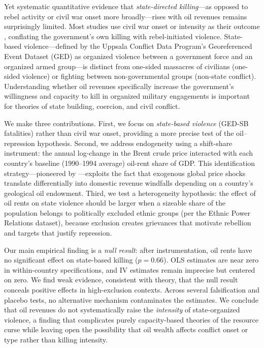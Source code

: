 \documentclass[12pt]{article}
\begin{document}
Yet systematic quantitative evidence that \emph{state-directed killing}---as
opposed to rebel activity or civil war onset more broadly---rises with oil
revenues remains surprisingly limited.
Most studies use civil war onset or intensity as their outcome
\citep{collier2004greed,humphreys2005natural,bruckner2010international},
conflating the government's own killing with rebel-initiated violence.
State-based violence---defined by the Uppsala Conflict Data
Program's Georeferenced Event Dataset (GED) as organized violence between
a government force and an organized armed group---is distinct from
one-sided massacres of civilians (one-sided violence) or fighting between
non-governmental groups (non-state conflict).
Understanding whether oil revenues specifically increase the government's
willingness and capacity to kill in organized military engagements is important
for theories of state building, coercion, and civil conflict.

We make three contributions.
First, we focus on \emph{state-based violence} (GED-SB fatalities) rather
than civil war onset, providing a more precise test of the oil--repression
hypothesis.
Second, we address endogeneity using a shift-share instrument:
the annual log-change in the Brent crude price interacted with
each country's baseline (1990--1994 average) oil-rent share of GDP.
This identification strategy---pioneered by
\citet{bruckner2010international}---exploits the fact that exogenous global
price shocks translate differentially into domestic revenue windfalls
depending on a country's geological oil endowment.
Third, we test a heterogeneity hypothesis: the effect of oil rents on
state violence should be larger when a sizeable share of the population
belongs to politically excluded ethnic groups (per the Ethnic Power Relations
dataset), because exclusion creates grievances that motivate rebellion and
targets that justify repression.

Our main empirical finding is a \emph{null result}:
after instrumentation, oil rents have no significant effect on
state-based killing ($p = 0.66$).
OLS estimates are near zero in within-country specifications,
and IV estimates remain imprecise but centered on zero.
We find weak evidence, consistent with theory, that
the null result conceals positive effects in high-exclusion contexts.
Across several falsification and placebo tests,
no alternative mechanism contaminates the estimates.
We conclude that oil revenues do not systematically raise the
\emph{intensity} of state-organized violence,
a finding that complicates purely capacity-based theories of the
resource curse while leaving open the possibility that
oil wealth affects conflict onset or type rather than killing intensity.
\end{document}
